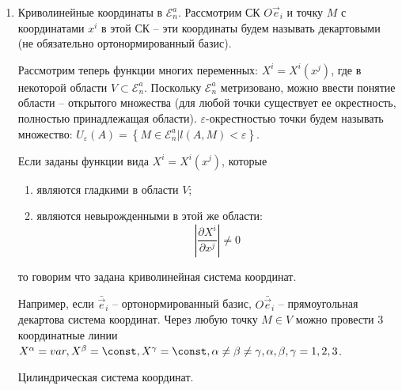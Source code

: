 \begin{enumerate}
  \item Криволинейные координаты в $\mathcal{E}_n^a$. Рассмотрим СК $O\vec{e}_i$ и точку $M$ с
    координатами $x^i$ в этой СК -- эти координаты будем называть декартовыми (не обязательно
    ортонормированный базис).
    
    \begin{figure}[H]
    	\centering
    	
    \end{figure}
    
    Рассмотрим теперь функции многих переменных: $X^i = X^i (x^j)$, где в некоторой области
    $V \subset \mathcal{E}_n^a$. Поскольку $\mathcal{E}_n^a$ метризовано, можно ввести понятие 
    области -- открытого множества (для любой точки существует ее окрестность, полностью
    принадлежащая области). $\varepsilon$-окрестностью точки будем называть множество:
    $U_\varepsilon(A) = \left\{ M \in \mathcal{E}_n^a | l(A, M) < \varepsilon \right\} $.
    
    \begin{figure}[H]
    	\centering
    	
    \end{figure}
    
    Если заданы функции вида $X^i = X^i (x^j)$, которые
    \begin{enumerate}
      \item являются гладкими в области $V$;
      \item являются невырожденными в этой же области:
        \[
          \left| \dfrac{\partial X^i}{\partial x^j} \right| \neq 0
        \]
    \end{enumerate}
    то говорим что задана криволинейная система координат.
  
    Например, если $\bar{\vec{e}}_i$ -- ортонормированный базис, $O\bar{\vec{e}}_i$ -- прямоугольная
    декартова система координат. Через любую точку $M \in V$ можно провести 3 координатные линии
    $X^\alpha = var, X^{\beta} = \const, X^\gamma = \const, \alpha \neq \beta \neq \gamma, \alpha, \beta, \gamma = 1, 2, 3$.
    
    \begin{figure}[H]
    	\centering
    	
    \end{figure}

	\begin{example}
		Цилиндрическая система координат. 
		

\end{example}
\end{enumerate}
